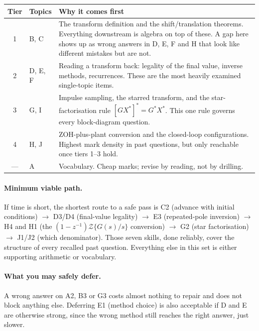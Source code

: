 \documentclass[10pt]{article}
\newcommand{\Z}{\mathcal{Z}}
\begin{document}
\begin{center}
\begin{tabular}{@{}cl>{\raggedright\arraybackslash}p{62mm}@{}}
\toprule
Tier & Topics & Why it comes first \\
\midrule
1 & B, C & The transform definition and the shift/translation theorems. Everything
        downstream is algebra on top of these. A gap here shows up as wrong answers
        in D, E, F and H that look like different mistakes but are not. \\
2 & D, E, F & Reading a transform back: legality of the final value, inverse methods,
        recurrences. These are the most heavily examined single-topic items. \\
3 & G, I & Impulse sampling, the starred transform, and the star-factorisation rule
        \(\left[GX^{*}\right]^{*}=G^{*}X^{*}\). This one rule governs every
        block-diagram question. \\
4 & H, J & ZOH-plus-plant conversion and the closed-loop configurations. Highest mark
        density in past questions, but only reachable once tiers 1--3 hold. \\
--- & A & Vocabulary. Cheap marks; revise by reading, not by drilling. \\
\bottomrule
\end{tabular}
\end{center}

\paragraph{Minimum viable path.} If time is short, the shortest route to a safe pass is
C2 (advance with initial conditions) \(\to\) D3/D4 (final-value legality) \(\to\)
E3 (repeated-pole inversion) \(\to\) H4 and H1 (the \((1-z^{-1})\Z\{G(s)/s\}\)
conversion) \(\to\) G2 (star factorisation) \(\to\) J1/J2 (which denominator).
Those seven skills, done reliably, cover the structure of every recalled past
question. Everything else in this set is either supporting arithmetic or vocabulary.

\paragraph{What you may safely defer.} A wrong answer on A2, B3 or G3 costs almost
nothing to repair and does not block anything else. Deferring E1 (method choice) is
also acceptable if D and E are otherwise strong, since the wrong method still
reaches the right answer, just slower.
\end{document}
